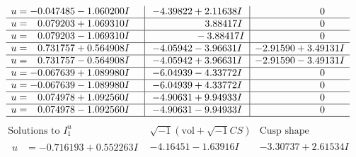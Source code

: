 \documentclass[1p]{elsarticle_modified}
\theoremstyle{definition}
\newcommand{\I}{\sqrt{-1}}
\begin{document}
$$\begin{array}{c|c|c}
\begin{aligned}
u &= -0.047485 - 1.060200 I\end{aligned}
 & -4.39822 + 2.11638 I & \phantom{-0.000000 } 0 \\ \hline\begin{aligned}
u &= \phantom{-}0.079203 + 1.069310 I\end{aligned}
 & \phantom{-0.000000 -}3.88417 I & \phantom{-0.000000 } 0 \\ \hline\begin{aligned}
u &= \phantom{-}0.079203 - 1.069310 I\end{aligned}
 & \phantom{-0.000000 } -3.88417 I & \phantom{-0.000000 } 0 \\ \hline\begin{aligned}
u &= \phantom{-}0.731757 + 0.564908 I\end{aligned}
 & -4.05942 - 3.96631 I & -2.91590 + 3.49131 I \\ \hline\begin{aligned}
u &= \phantom{-}0.731757 - 0.564908 I\end{aligned}
 & -4.05942 + 3.96631 I & -2.91590 - 3.49131 I \\ \hline\begin{aligned}
u &= -0.067639 + 1.089980 I\end{aligned}
 & -6.04939 - 4.33772 I & \phantom{-0.000000 } 0 \\ \hline\begin{aligned}
u &= -0.067639 - 1.089980 I\end{aligned}
 & -6.04939 + 4.33772 I & \phantom{-0.000000 } 0 \\ \hline\begin{aligned}
u &= \phantom{-}0.074978 + 1.092560 I\end{aligned}
 & -4.90631 + 9.94933 I & \phantom{-0.000000 } 0 \\ \hline\begin{aligned}
u &= \phantom{-}0.074978 - 1.092560 I\end{aligned}
 & -4.90631 - 9.94933 I & \phantom{-0.000000 } 0\\
 \hline 
 \end{array}$$\newpage$$\begin{array}{c|c|c}  
\text{Solutions to }I^u_{1}& \I (\text{vol} + \sqrt{-1}CS) & \text{Cusp shape}\\
 \hline 
\begin{aligned}
u &= -0.716193 + 0.552263 I\end{aligned}
 & -4.16451 - 1.63916 I & -3.30737 + 2.61534 I \\ \hline\begin{aligned}

\end{aligned}
\end{array}$$
\end{document}

